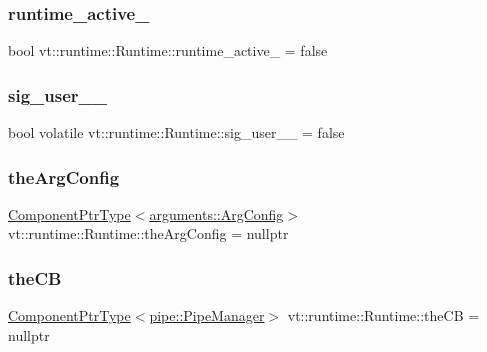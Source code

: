 \subsubsection{\texorpdfstring{runtime\+\_\+active\+\_\+}{runtime\_active\_}}
{\footnotesize\ttfamily bool vt\+::runtime\+::\+Runtime\+::runtime\+\_\+active\+\_\+ = false\hspace{0.3cm}{\ttfamily [protected]}}

\mbox{\label{structvt_1_1runtime_1_1_runtime_ac0373f2326b45f348e2db166d328e2d6}} 
\subsubsection{\texorpdfstring{sig\+\_\+user\+\_\+\_\+}{sig\_user\_1\_}}
{\footnotesize\ttfamily bool volatile vt\+::runtime\+::\+Runtime\+::sig\+\_\+user\+\_\+\_\+ = false\hspace{0.3cm}{\ttfamily [static]}}

\mbox{\label{structvt_1_1runtime_1_1_runtime_a30b262f43f826ffee213e10c71893323}} 
\subsubsection{\texorpdfstring{the\+Arg\+Config}{theArgConfig}}
{\footnotesize\ttfamily \hyperlink{structvt_1_1runtime_1_1_runtime_a0893bf0a8c03b898e8ab66b52cec80ad}{Component\+Ptr\+Type}$<$\hyperlink{structvt_1_1arguments_1_1_arg_config}{arguments\+::\+Arg\+Config}$>$ vt\+::runtime\+::\+Runtime\+::the\+Arg\+Config = nullptr}

\mbox{\label{structvt_1_1runtime_1_1_runtime_a8f4f5ea53aed7d2302bc52a39c16de0b}} 
\subsubsection{\texorpdfstring{the\+CB}{theCB}}
{\footnotesize\ttfamily \hyperlink{structvt_1_1runtime_1_1_runtime_a0893bf0a8c03b898e8ab66b52cec80ad}{Component\+Ptr\+Type}$<$\hyperlink{structvt_1_1pipe_1_1_pipe_manager}{pipe\+::\+Pipe\+Manager}$>$ vt\+::runtime\+::\+Runtime\+::the\+CB = nullptr}

